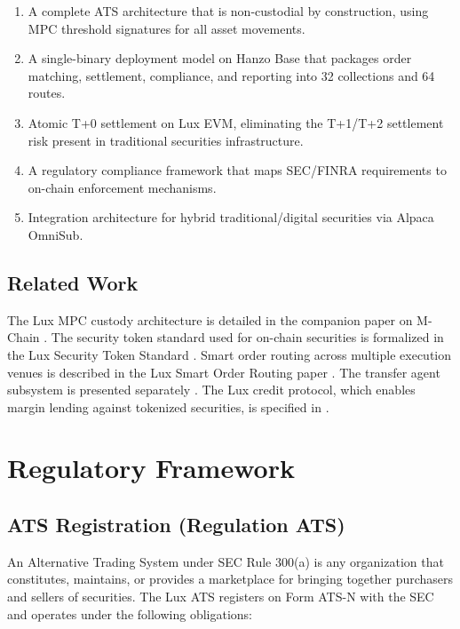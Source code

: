 \documentclass[11pt,a4paper]{article}
\begin{document}
\begin{enumerate}[nosep]
  \item A complete ATS architecture that is non-custodial by construction, using MPC threshold signatures for all asset movements.
  \item A single-binary deployment model on Hanzo Base that packages order matching, settlement, compliance, and reporting into 32 collections and 64 routes.
  \item Atomic T+0 settlement on Lux EVM, eliminating the T+1/T+2 settlement risk present in traditional securities infrastructure.
  \item A regulatory compliance framework that maps SEC/FINRA requirements to on-chain enforcement mechanisms.
  \item Integration architecture for hybrid traditional/digital securities via Alpaca OmniSub.
\end{enumerate}

\subsection{Related Work}

The Lux MPC custody architecture is detailed in the companion paper on M-Chain \cite{lux-mchain-mpc}. The security token standard used for on-chain securities is formalized in the Lux Security Token Standard \cite{lux-security-token-standard}. Smart order routing across multiple execution venues is described in the Lux Smart Order Routing paper \cite{lux-smart-order-routing}. The transfer agent subsystem is presented separately \cite{lux-transfer-agent}. The Lux credit protocol, which enables margin lending against tokenized securities, is specified in \cite{lux-credit-protocol-spec}.

\section{Regulatory Framework}\label{sec:regulatory}

\subsection{ATS Registration (Regulation ATS)}

An Alternative Trading System under SEC Rule 300(a) is any organization that constitutes, maintains, or provides a marketplace for bringing together purchasers and sellers of securities. The Lux ATS registers on Form ATS-N with the SEC and operates under the following obligations:
\end{document}
